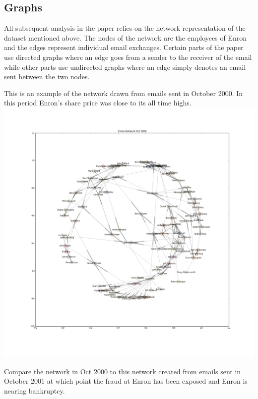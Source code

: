 \documentclass[12pt]{article}
\begin{document}
	\subsection{Graphs}
	All subsequent analysis in the paper relies on the network representation of the dataset mentioned above. The nodes of the network are the employees of Enron and the edges represent individual email exchanges. Certain parts of the paper use directed graphs where an edge goes from a sender to the receiver of the email while other parts use undirected graphs where an edge simply denotes an email sent between the two nodes.
	
	This is an example of the network drawn from emails sent in October 2000. In this period Enron's share price was close to its all time highs. \\
	\includegraphics[width=1\textwidth]{figureEnronOct2000}
	
	Compare the network in Oct 2000 to this network created from emails sent in October 2001 at which point the fraud at Enron has been exposed and Enron is nearing bankruptcy.
	
\end{document}
